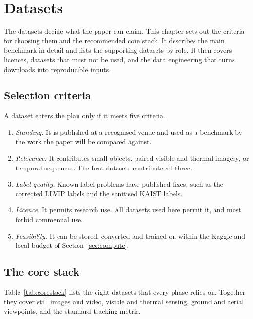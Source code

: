 \chapter{Datasets}
\label{ch:data}

The datasets decide what the paper can claim. This chapter sets out the
criteria for choosing them and the recommended core stack. It describes the
main benchmark in detail and lists the supporting datasets by role. It then
covers licences, datasets that must not be used, and the data engineering
that turns downloads into reproducible inputs.

\section{Selection criteria}

A dataset enters the plan only if it meets five criteria.
\begin{enumerate}
  \item \emph{Standing.} It is published at a recognised venue and used as a
        benchmark by the work the paper will be compared against.
  \item \emph{Relevance.} It contributes small objects, paired visible and
        thermal imagery, or temporal sequences. The best datasets contribute
        all three.
  \item \emph{Label quality.} Known label problems have published fixes,
        such as the corrected LLVIP labels and the sanitised KAIST labels.
  \item \emph{Licence.} It permits research use. All datasets used here
        permit it, and most forbid commercial use.
  \item \emph{Feasibility.} It can be stored, converted and trained on within
        the Kaggle and local budget of Section~\ref{sec:compute}.
\end{enumerate}

\section{The core stack}
\label{sec:corestack}

Table~\ref{tab:corestack} lists the eight datasets that every phase relies
on. Together they cover still images and video, visible and thermal
sensing, ground and aerial viewpoints, and the standard tracking metric.

